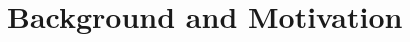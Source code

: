 \documentclass[conference]{IEEEtran}
\begin{document}
%
%
%
%
%
%
%
%


\section{Background and Motivation}
\end{document}
